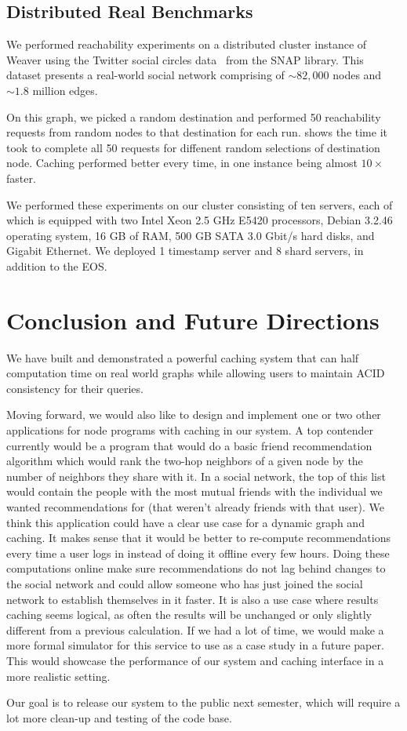 \documentclass[letterpaper,twocolumn,11pt,tight]{article}
\begin{document}
\subsection{Distributed Real Benchmarks}
We performed reachability experiments on a distributed cluster instance of Weaver using the Twitter social circles data~\cite{twitter_data} from the SNAP library.
This dataset presents a real-world social network comprising of $\sim 82,000$ nodes
and $\sim 1.8$ million edges.

On this graph, we picked a random destination and performed 50 reachability requests from random nodes to that destination for each run.  shows the time it took to complete all 50 requests for diffenent random selections of destination node. Caching performed better every time, in one instance being almost $10\times$ faster.

We performed these experiments on our cluster consisting of ten
    servers, each of which is equipped with two Intel Xeon 2.5 GHz E5420 processors, Debian 3.2.46 operating system, 16 GB of RAM, 500 GB SATA 3.0 Gbit/s hard disks, and Gigabit Ethernet.
We deployed 1 timestamp server and 8 shard servers, in addition to the EOS.

\section{Conclusion and Future Directions}\label{sec:conclusion}
We have built and demonstrated a powerful caching system that can half computation time on real world graphs while allowing users to maintain ACID consistency for their queries.

Moving forward, we would also like to design and implement one or two other applications for node programs with caching in our system.
A top contender currently would be a program that would do a basic friend recommendation algorithm which would rank the two-hop neighbors of a given node by the number of neighbors they share with it.
In a social network, the top of this list would contain the people with the most mutual friends with the individual we wanted recommendations for (that weren't already friends with that user).
We think this application could have a clear use case for a dynamic graph and caching. It makes sense that it would be better to re-compute recommendations every time a user logs in instead of doing it offline every few hours.
Doing these computations online make sure recommendations do not lag behind changes to the social network and could allow someone who has just joined the social network to establish themselves in it faster. It is also a use case where results caching seems logical, as often the results will be unchanged or only slightly different from a previous calculation.
 If we had a lot of time, we would make a more formal simulator for this service to use as a case study in a future paper. This would showcase the performance of our system and caching interface in a more realistic setting.

 Our goal is to release our system to the public next semester, which will require a lot more clean-up and testing of the code base.

\footnotesize

\end{document}
